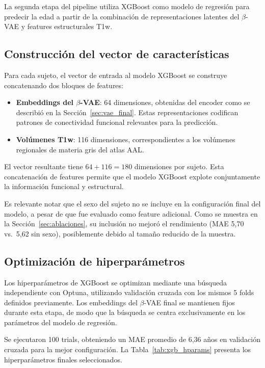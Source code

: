 La segunda etapa del pipeline utiliza XGBoost como modelo de regresión para predecir la edad a partir de la combinación de representaciones latentes del $\beta$-VAE y features estructurales T1w.

\subsection{Construcción del vector de características}

Para cada sujeto, el vector de entrada al modelo XGBoost se construye concatenando dos bloques de features:
\begin{itemize}
    \item \textbf{Embeddings del $\beta$-VAE}: 64 dimensiones, obtenidas del encoder como se describió en la Sección~\ref{sec:vae_final}. Estas representaciones codifican patrones de conectividad funcional relevantes para la predicción.
    \item \textbf{Volúmenes T1w}: 116 dimensiones, correspondientes a los volúmenes regionales de materia gris del atlas AAL.
\end{itemize}

El vector resultante tiene $64 + 116 = 180$ dimensiones por sujeto. Esta concatenación de features permite que el modelo XGBoost explote conjuntamente la información funcional y estructural.

Es relevante notar que el sexo del sujeto no se incluye en la configuración final del modelo, a pesar de que fue evaluado como feature adicional. Como se muestra en la Sección~\ref{sec:ablaciones}, su inclusión no mejoró el rendimiento (MAE 5,70 vs.\ 5,62 sin sexo), posiblemente debido al tamaño reducido de la muestra.

\subsection{Optimización de hiperparámetros}
\label{sec:optuna_xgb}

Los hiperparámetros de XGBoost se optimizan mediante una búsqueda independiente con Optuna, utilizando validación cruzada con los mismos 5 folds definidos previamente. Los embeddings del $\beta$-VAE final se mantienen fijos durante esta etapa, de modo que la búsqueda se centra exclusivamente en los parámetros del modelo de regresión.

Se ejecutaron 100 trials, obteniendo un MAE promedio de 6,36 años en validación cruzada para la mejor configuración. La Tabla~\ref{tab:xgb_hparams} presenta los hiperparámetros finales seleccionados.

